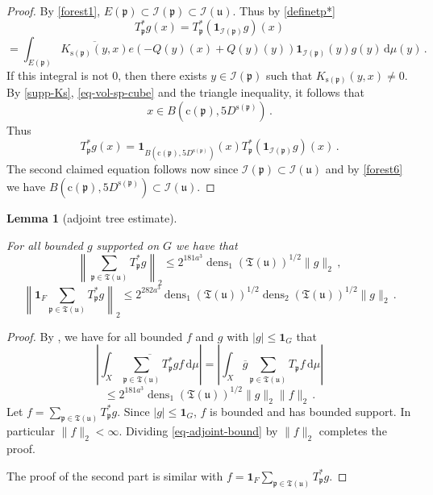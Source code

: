 \documentclass[10pt,a4paper]{article}
\theoremstyle{plain}
\newtheorem{lemma}[theorem]{Lemma}
\theoremstyle{definition}
\numberwithin{equation}{subsection}
\DeclareMathOperator{\dens}{\operatorname{dens}}
\newcommand{\fp}{{\mathfrak p}}
\newcommand{\fu}{{\mathfrak u}}
\newcommand{\fT}{{\mathfrak T}}
\newcommand{\pc}{{\mathrm{c}}}
\newcommand{\ps}{{\mathrm{s}}}
\newcommand{\scI}{{\mathcal{I}}} %
\newcommand{\tQ}{{Q}}
\newcommand{\lean}[1]{}
\newcommand{\uses}[1]{}
\newcommand{\leanok}{}
\begin{document}
\begin{proof}
    \leanok
    By \eqref{forest1}, $E(\fp) \subset \scI(\fp) \subset \scI(\fu)$. Thus by \eqref{definetp*}
    $$
         T_{\fp}^* g(x) = T_{\fp}^* (\mathbf{1}_{\scI(\fp)} g)(x)
    $$
    $$
        = \int_{E(\fp)} \overline{K_{\ps(\fp)}(y,x)} e(-\tQ(y)(x) + \tQ(y)(y)) \mathbf{1}_{\scI(\fp)}(y) g(y) \, \mathrm{d}\mu(y)\,.
    $$
    If this integral is not $0$, then there exists $y \in \scI(\fp)$ such that $K_{\ps(\fp)}(y,x) \ne 0$. By \eqref{supp-Ks}, \eqref{eq-vol-sp-cube} and the triangle inequality, it follows that
    \begin{equation*}
        x \in B(\pc(\fp), 5 D^{\ps(\fp)})\, .
    \end{equation*}
    Thus
    $$
        T_{\fp}^* g(x) = \mathbf{1}_{B(\pc(\fp), 5D^{\ps(\fp)})}(x) T_{\fp}^* (\mathbf{1}_{\scI(\fp)} g)(x)\,.
    $$
    The second claimed equation follows now since $\scI(\fp) \subset \scI(\fu)$ and by \eqref{forest6} we have $B(\pc(\fp), 5D^{\ps(\fp)}) \subset \scI(\fu)$.
\end{proof}

\begin{lemma}[adjoint tree estimate]
    \label{adjoint-tree-estimate}
    \leanok
    \lean{TileStructure.Forest.adjoint_tree_estimate, TileStructure.Forest.indicator_adjoint_tree_estimate}
    \uses{densities-tree-bound}
    For all bounded $g$ supported on $G$ we have that
    $$
        \left\| \sum_{\fp \in \fT(\fu)} T_{\fp}^* g\right\|_2 \le 2^{181a^3} \dens_1(\fT(\fu))^{1/2} \|g\|_2\,,
    $$
    $$
        \left\| \mathbf{1}_F \sum_{\fp \in \fT(\fu)} T_{\fp}^* g\right\|_2 \le 2^{282a^3} \dens_1(\fT(\fu))^{1/2} \dens_2(\fT(\fu))^{1/2} \|g\|_2\,.
    $$
\end{lemma}

\begin{proof}
    \leanok
    By , we have for all bounded $f$ and $g$ with $|g| \le \mathbf{1}_G$ that
    $$
        \left| \int_X \overline{\sum_{\fp\in \fT(\fu)} T_{\fp}^* g} f \,\mathrm{d}\mu \right| = \left| \int_X \overline{g} \sum_{\fp \in \fT(\fu)} T_{\fp} f \,\mathrm{d}\mu \right|
    $$
    \begin{equation}
        \label{eq-adjoint-bound}
        \le 2^{181a^3} \dens_1(\fT(\fu))^{1/2} \|g\|_2 \|f\|_2\,.
    \end{equation}
    Let $f = \sum_{\fp \in \fT(\fu)} T_{\fp}^* g$. Since $|g| \le \mathbf{1}_G$, $f$ is bounded and has bounded support. In particular $\|f\|_2 < \infty$. Dividing \eqref{eq-adjoint-bound} by $\|f\|_2$ completes the proof.

    The proof of the second part is similar with $f = \mathbf{1}_F \sum_{\fp \in \fT(\fu)} T_{\fp}^* g$.
\end{proof}
\end{document}

